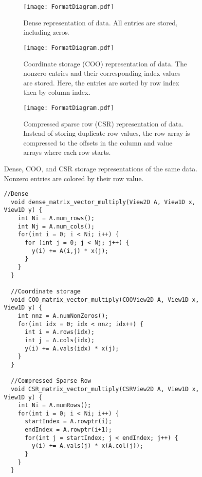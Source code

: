 \begin{figure*}
  \centering
  \begin{subfigure}{0.45\textwidth}
    \texttt{[image: FormatDiagram.pdf]}
    \caption{Dense representation of data. All entries are stored, including zeros.}\label{FormatDiagram:Dense}
  \end{subfigure}
  \begin{subfigure}{0.45\textwidth}
    \texttt{[image: FormatDiagram.pdf]}
    \caption{Coordinate storage (COO) representation of data. The nonzero entries and their corresponding index values are stored. Here, the entries are sorted by row index then by column index.}\label{FormatDiagram:COO}
  \end{subfigure}

  \begin{subfigure}[c]{0.45\textwidth}
    \texttt{[image: FormatDiagram.pdf]}
    \caption{Compressed sparse row (CSR) representation of data. Instead of storing duplicate row values, the row array is compressed to the offsets in the column and value arrays where each row starts.}\label{FormatDiagram:CSR}
  \end{subfigure}
\caption{Dense, COO, and CSR storage representations of the same data.  Nonzero entries are colored by their row value.}\label{FormatDiagram}
\end{figure*}
\begin{figure}
  \begin{lstlisting}[caption={Sparse matrix vector multiply (SpMV) routines for matrices in different formats. Note that essentially every line of code is different in each implementation, even though they implement the same computation.},label=DenseAndSparseMV]  
  //Dense
  void dense_matrix_vector_multiply(View2D A, View1D x, View1D y) {
    int Ni = A.num_rows();
    int Nj = A.num_cols();
    for(int i = 0; i < Ni; i++) {
      for (int j = 0; j < Nj; j++) {
        y(i) += A(i,j) * x(j);
      }
    }
  }
  
  //Coordinate storage
  void COO_matrix_vector_multiply(COOView2D A, View1D x, View1D y) {
    int nnz = A.numNonZeros();
    for(int idx = 0; idx < nnz; idx++) {
      int i = A.rows(idx);
      int j = A.cols(idx);
      y(i) += A.vals(idx) * x(j);
    }
  }
  
  //Compressed Sparse Row
  void CSR_matrix_vector_multiply(CSRView2D A, View1D x, View1D y) {
    int Ni = A.numRows();
    for(int i = 0; i < Ni; i++) {
      startIndex = A.rowptr(i);
      endIndex = A.rowptr(i+1);
      for(int j = startIndex; j < endIndex; j++) {
        y(i) += A.vals(j) * x(A.col(j));
      }
    }
  }
  \end{lstlisting}
  \end{figure}
